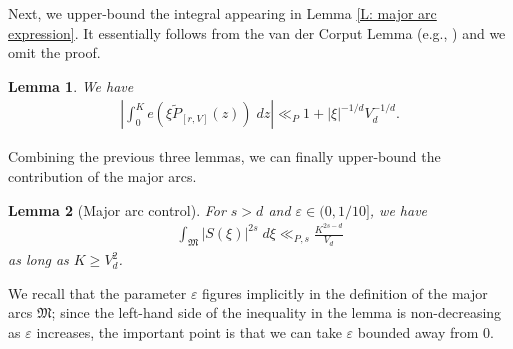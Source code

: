\documentclass[11pt]{amsart}
\newtheorem{lemma}{Lemma}[section]
\theoremstyle{definition}
\newcommand{\veps}{\varepsilon}
\newcommand{\abs}[1]{\mathopen{}\left| #1\mathclose{}\right|}
\begin{document}
Next, we upper-bound the integral appearing in Lemma \ref{L: major arc expression}. It essentially follows from the van der Corput Lemma (e.g., \cite[pp. 332]{Ste93}) and we omit the proof.
\begin{lemma}\label{L: integral bound}
    We have
    \begin{align*}
        \abs{\int_0^K e(\xi \widetilde{P}_{[r, V]}(z))\; dz}\ll_P 1 + |\xi|^{-1/d}V_d^{-1/d}.
    \end{align*}
\end{lemma}


Combining the previous three lemmas, we can finally upper-bound the contribution of the major arcs. 
\begin{lemma}[Major arc control]\label{L: major arcs}
    For $s>d$ and $\veps\in (0, 1/10]$, we have
    \begin{align*}
        \int_\mathfrak{M}\abs{S(\xi)}^{2s}\; d\xi \ll_{P, s} \frac{K^{2s-d}}{V_d}
    \end{align*}
    as long as $K\geq V_d^2$.
\end{lemma}
We recall that the parameter $\veps$ figures implicitly in the definition of the major arcs $\mathfrak{M}$; since the left-hand side of the inequality in the lemma is non-decreasing as $\veps$ increases, the important point is that we can take $\veps$ bounded away from $0$.
\end{document}
